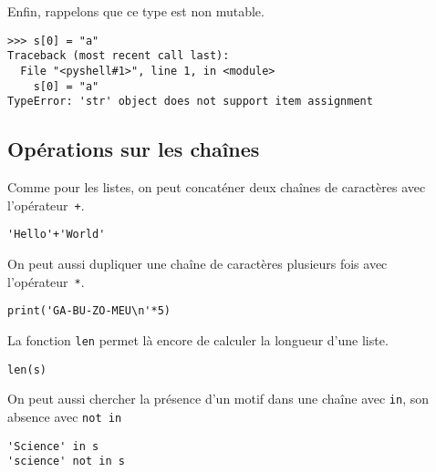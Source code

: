 Enfin, rappelons que ce type est non mutable.
\begin{lstlisting}
>>> s[0] = "a"
Traceback (most recent call last):
  File "<pyshell#1>", line 1, in <module>
    s[0] = "a"
TypeError: 'str' object does not support item assignment
\end{lstlisting}

\subsection{Opérations sur les chaînes}

Comme pour les listes, on peut concaténer deux chaînes de caractères avec l'opérateur~\texttt{+}.
\begin{lstlisting}
'Hello'+'World'
\end{lstlisting}
On peut aussi dupliquer une chaîne de caractères plusieurs fois avec l'opérateur~\texttt{*}.
\begin{lstlisting}
print('GA-BU-ZO-MEU\n'*5)
\end{lstlisting}
La fonction \texttt{len} permet là encore de calculer la longueur d'une liste.
\begin{lstlisting}
len(s)
\end{lstlisting}
On peut aussi chercher la présence d'un motif dans une chaîne avec \texttt{in}, son absence avec \texttt{not in}
\begin{lstlisting}
'Science' in s
'science' not in s
\end{lstlisting}



